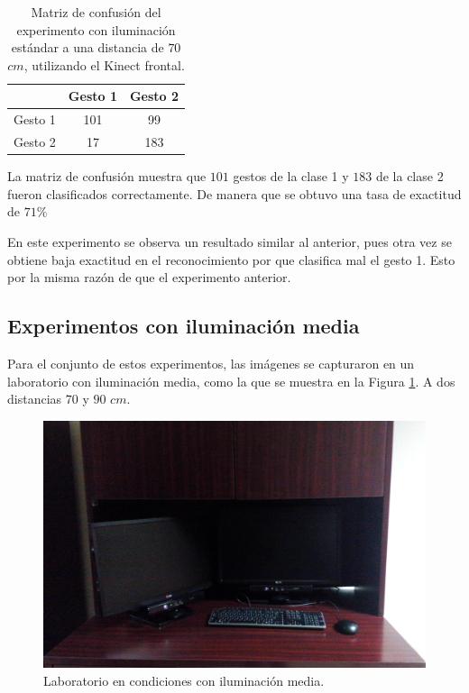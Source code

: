 \begin{itemize}
\begin{table}[h!] 
\begin{center}
\caption{Matriz de confusión del experimento con iluminación estándar a una distancia de $70$ $cm$, utilizando el Kinect frontal.}
\label{table:90LK1}
\begin{tabular}{ r || c | c |} 
        & Gesto 1 & Gesto 2 \\ \hline \hline  
Gesto 1 &  101   & 99      \\ \hline  
Gesto 2 &  17    & 183     \\   
\end{tabular}
\end{center} 
\end{table} 

La matriz de confusión muestra que $101$ gestos de la clase 1 y $183$ de la clase 2 fueron clasificados correctamente. De manera que se obtuvo una tasa de exactitud de $71 \%$  

\end{itemize}

En este experimento se observa un resultado similar al anterior, pues otra vez se obtiene baja exactitud en el reconocimiento por que clasifica mal el gesto 1. Esto por la misma razón de que el experimento anterior.



\subsection{Experimentos con iluminación media} 
Para el conjunto de estos experimentos, las imágenes se capturaron en un laboratorio con iluminación media, como la que se muestra en la Figura \ref{fig:LabMedioIluminado}. A dos distancias $70$ y $90$ $cm$.  

\begin{figure}[h!]
\begin{center} 
\includegraphics[scale=0.09]{./Figures/mediailuminacion.jpg}
\end{center}
\caption{Laboratorio en condiciones con iluminación media.}
\label{fig:LabMedioIluminado} 
\end{figure}  

